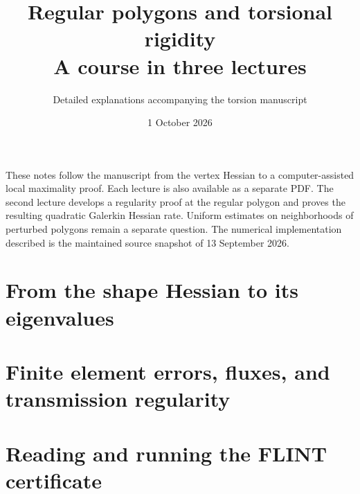 \documentclass[11pt]{article}
\title{Regular polygons and torsional rigidity\\A course in three lectures}
\author{Detailed explanations accompanying the torsion manuscript}
\date{1 October 2026}
\begin{document}
\maketitle
These notes follow the manuscript from the vertex Hessian to a computer-assisted
local maximality proof. Each lecture is also available as a separate PDF.
The second lecture develops a regularity proof at the regular polygon and
proves the resulting quadratic Galerkin Hessian rate. Uniform estimates
on neighborhoods of perturbed polygons remain a separate question.
The numerical implementation described is the maintained
 source snapshot of 13 September 2026.
\tableofcontents
\clearpage
\part{From the shape Hessian to its eigenvalues}

\clearpage
\part{Finite element errors, fluxes, and transmission regularity}

\clearpage
\part{Reading and running the FLINT certificate}



\end{document}
